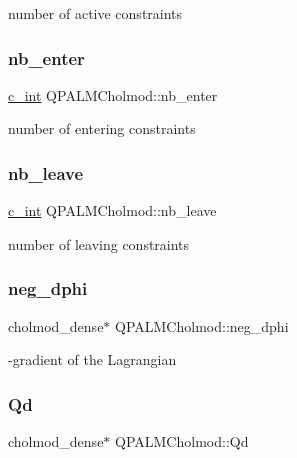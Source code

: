 number of active constraints 

\mbox{\label{structQPALMCholmod_ae5447313a38c410f87578b1e24c54e8f}} 
\subsubsection{\texorpdfstring{nb\_enter}{nb\_enter}}
{\footnotesize\ttfamily \mbox{\hyperlink{global__opts_8h_aa3217a0f49d3e52b74e9dd830c44472f}{c\+\_\+int}} Q\+P\+A\+L\+M\+Cholmod\+::nb\+\_\+enter}



number of entering constraints 

\mbox{\label{structQPALMCholmod_a3d848261dea95f43ff0ccf8c32db4622}} 
\subsubsection{\texorpdfstring{nb\_leave}{nb\_leave}}
{\footnotesize\ttfamily \mbox{\hyperlink{global__opts_8h_aa3217a0f49d3e52b74e9dd830c44472f}{c\+\_\+int}} Q\+P\+A\+L\+M\+Cholmod\+::nb\+\_\+leave}



number of leaving constraints 

\mbox{\label{structQPALMCholmod_a7c0275f19a37eb6108f98c867c2c843f}} 
\subsubsection{\texorpdfstring{neg\_dphi}{neg\_dphi}}
{\footnotesize\ttfamily cholmod\+\_\+dense$\ast$ Q\+P\+A\+L\+M\+Cholmod\+::neg\+\_\+dphi}



-\/gradient of the Lagrangian 

\mbox{\label{structQPALMCholmod_abaedb802a939e9ee04577c87bb9f25cc}} 
\subsubsection{\texorpdfstring{Qd}{Qd}}
{\footnotesize\ttfamily cholmod\+\_\+dense$\ast$ Q\+P\+A\+L\+M\+Cholmod\+::\+Qd}




